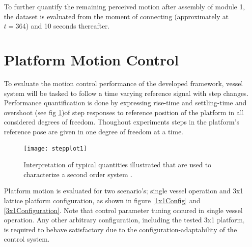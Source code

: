To further quantify the remaining perceived motion after assembly of module 1, the dataset is evaluated from the moment of connecting (approximately at $t=364$) and 10 seconds thereafter. 

\begin{table}[H]
	
	\caption{Signal analysis of relative motion of module 1 with respect to body-fixed frame of module 2 for $364<t<374$.}
	\label{tab:ConnectVariationTableOut}
\end{table}


\section{Platform Motion Control}
\label{evaluationMotionControl}
To evaluate the motion control performance of the developed framework, vessel system will be tasked to follow a time varying reference signal with step changes. Performance quantification is done by expressing rise-time and settling-time and overshoot (see fig \ref{fig:matlabStepresponseFig})of step responses to reference position of the platform in all considered degrees of freedom. Thoughout experiments steps in the platform's reference pose are given in one degree of freedom at a time. 

\begin{figure}[H]
	\centering
	\texttt{[image: stepplot1]}
	\caption{Interpretation of typical quantities illustrated that are used to characterize a second order system \cite{stepinfoWebMatlab}.}
	\label{fig:matlabStepresponseFig}
\end{figure}

Platform motion is evaluated for two scenario's; single vessel operation and 3x1 lattice platform configuration, as shown in figure \ref{1x1Config} and \ref{3x1Configuration}. Note that control parameter tuning occured in single vessel operation. Any other arbitrary configuration, including the tested 3x1 platform, is required to behave satisfactory due to the configuration-adaptability of the control system. 

